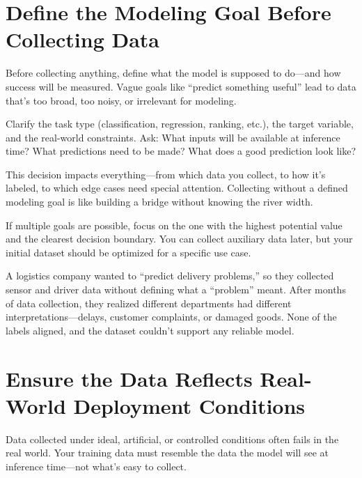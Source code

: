 \documentclass[12pt,openany]{book}
\begin{document}
\section{Define the Modeling Goal Before Collecting Data}

Before collecting anything, define what the model is supposed to do—and how success will be measured. Vague goals like “predict something useful” lead to data that's too broad, too noisy, or irrelevant for modeling.
\newline

Clarify the task type (classification, regression, ranking, etc.), the target variable, and the real-world constraints. Ask: What inputs will be available at inference time? What predictions need to be made? What does a good prediction look like?
\newline

This decision impacts everything—from which data you collect, to how it’s labeled, to which edge cases need special attention. Collecting without a defined modeling goal is like building a bridge without knowing the river width.
\newline

If multiple goals are possible, focus on the one with the highest potential value and the clearest decision boundary. You can collect auxiliary data later, but your initial dataset should be optimized for a specific use case.

\begin{examplebox}
A logistics company wanted to “predict delivery problems,” so they collected sensor and driver data without defining what a “problem” meant. After months of data collection, they realized different departments had different interpretations—delays, customer complaints, or damaged goods. None of the labels aligned, and the dataset couldn’t support any reliable model.
\end{examplebox}



\section{Ensure the Data Reflects Real-World Deployment Conditions}

Data collected under ideal, artificial, or controlled conditions often fails in the real world. Your training data must resemble the data the model will see at inference time—not what’s easy to collect. \newline
\end{document}
